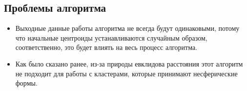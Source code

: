 \subsection{Проблемы алгоритма}

\begin{itemize}
\item Выходные данные работы алгоритма не всегда будут одинаковыми, потому что начальные центроиды устанавливаются случайным образом, соответственно, это будет влиять на весь процесс алгоритма.

\item Как было сказано ранее, из-за природы евклидова расстояния этот алгоритм не подходит для работы с кластерами, которые принимают несферические формы.
\end{itemize}